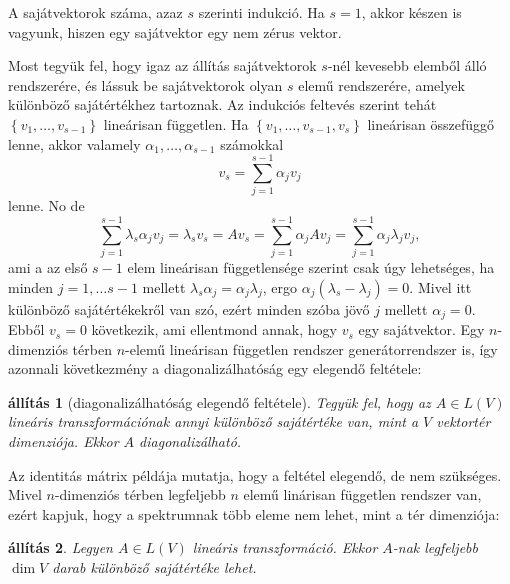 \documentclass[9pt, a4paper, showtrims]{memoir}
\makeatletter
\renewenvironment{proof}[1][\proofname]
    {\par\pushQED{\qed}%
    \normalfont \topsep6\p@\@plus6\p@\relax
    \trivlist
    \item[\hskip\labelsep
        \itshape
    #1\@addpunct{:}]\ignorespaces}
    {\popQED\endtrivlist\@endpefalse}
\theoremstyle{plain}
\newtheorem{proposition}{állítás}[chapter]
\theoremstyle{remark}
\theoremstyle{definition}
\makeatother
\begin{document}
    \begin{proof}
        A sajátvektorok száma, azaz $s$ szerinti indukció.
        Ha $s=1$, akkor készen is vagyunk,
        hiszen egy sajátvektor egy nem zérus vektor.

        Most tegyük fel, hogy igaz az állítás sajátvektorok $s$-nél kevesebb elemből álló rendszerére, 
        és lássuk be sajátvektorok olyan $s$ elemű rendszerére, amelyek különböző sajátértékhez tartoznak.
        Az indukciós feltevés szerint tehát $\left\{ v_1,\dots,v_{s-1} \right\}$ lineárisan független.
        Ha $\left\{ v_1,\dots,v_{s-1},v_s \right\}$ lineárisan összefüggő lenne,
        akkor valamely $\alpha_1,\dots,\alpha_{s-1}$ számokkal
        \[
            v_s=\sum_{j=1}^{s-1}\alpha_jv_j
        \]
        lenne. 
        No de
        \begin{equation*}
            \sum_{j=1}^{s-1}\lambda_s\alpha_jv_j
            =
            \lambda_sv_s
            =
            Av_s
            =
            \sum_{j=1}^{s-1}\alpha_jAv_j
            =
            \sum_{j=1}^{s-1}\alpha_j\lambda_jv_j,
        \end{equation*}
        ami a az első $s-1$ elem lineárisan függetlensége szerint csak úgy lehetséges,
        ha minden $j=1,\dots s-1$ mellett 
        \begin{math}
            \lambda_s\alpha_j
            =
            \alpha_j\lambda_j
        \end{math},
        ergo
        \begin{math}
            \alpha_j\left( \lambda_s-\lambda_j \right)
            =
            0.
        \end{math}
        Mivel itt különböző sajátértékekről van szó,
        ezért minden szóba jövő $j$ mellett $\alpha_j=0$.
        Ebből $v_s=0$ következik, 
        ami ellentmond annak, hogy $v_s$ egy sajátvektor.
    \end{proof}
    Egy $n$-dimenziós térben $n$-elemű lineárisan független rendszer generátorrendszer is, így
    azonnali következmény a diagonalizálhatóság egy elegendő feltétele:
    \begin{proposition}[diagonalizálhatóság elegendő feltétele]
        Tegyük fel, hogy az $A\in L\left( V \right)$ lineáris transzformációnak annyi különböző sajátértéke van, 
        mint a $V$ vektortér dimenziója.
        Ekkor $A$ diagonalizálható.
    \end{proposition}
    Az identitás mátrix példája mutatja, hogy a feltétel elegendő, de nem szükséges.
    Mivel $n$-dimenziós térben legfeljebb $n$ elemű linárisan független rendszer van,
    ezért kapjuk, hogy a spektrumnak több eleme nem lehet, mint a tér dimenziója:
    \begin{proposition}
        Legyen $A\in L\left( V \right)$ lineáris transzformáció.
        Ekkor $A$-nak legfeljebb $\dim V$ darab különböző sajátértéke lehet.
    \end{proposition}
\end{document}

